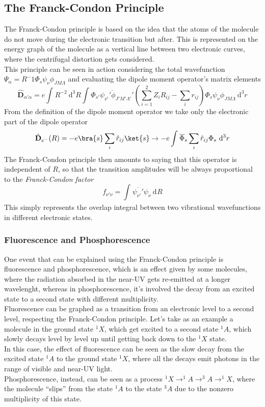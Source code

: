 \documentclass[a4paper, 11pt]{book}
\renewcommand{\vec}[1]{\mathbf{#1}}
\newcommand{\1}{\opr{\mathds{1}}}
\newcommand{\diff}[2][]{\ \mathrm{d}^{#1}#2}
\newcommand{\opr}[1]{\hat{#1}}
\newcommand{\cc}[1]{\overline{#1}}
\newcommand{\vecopr}[1]{\opr{\vec{#1}}}
\theoremstyle{plain}
\begin{document}
	\subsection{The Franck-Condon Principle}
	The Franck-Condon principle is based on the idea that the atoms of the molecule do not move during the electronic transition but after. This is represented on the energy graph of the molecule as a vertical line between two electronic curves, where the centrifugal distortion gets considered.\\
	This principle can be seen in action considering the total wavefunction $\Psi_\alpha=R^-1\Phi_s\psi_\nu\phi_{JM\Lambda}$ and evaluating the dipole moment operator's matrix elements
	\begin{equation}
		\vecopr{D}_{\alpha'\alpha}=e\int_{}^{}R^{-2}\diff[3]{R}\int_{}^{}\cc{\Phi_{s'}\psi_{\nu'}'\phi_{J'M'\Lambda'}'}\left( \sum_{i=1}^2Z_iR_{ij}-\sum_{i}r_{ij} \right)\Phi_s\psi_\nu\phi_{JM\Lambda}\diff[3]{r}
		\label{eq:frankcondon}
	\end{equation}
	From the definition of the dipole moment operator we take only the electronic part of the dipole operator
	\begin{equation*}
		\vecopr{D}_{e^-}(R)=-e\bra{s}\sum_i\opr{r}_{ij}\ket{s}\to-e\int_{}^{}\cc{\Phi}_s\sum_i\opr{r}_{ij}\Phi_s\diff[3]{r}
	\end{equation*}
	The Franck-Condon principle then amounts to saying that this operator is independent of $R$, so that the transition amplitudes will be always proportional to the \textit{Franck-Condon factor}
	\begin{equation}
		f_{\nu'\nu}=\int_{}^{}\cc{\psi_{\nu'}'}\psi_{\nu}\diff{R}
		\label{eq:franckcondonfactor}
	\end{equation}
	This simply represents the overlap integral between two vibrational wavefunctions in different electronic states.
	\subsubsection{Fluorescence and Phosphorescence}
	One event that can be explained using the Franck-Condon principle is fluorescence and phosphorescence, which is an effect given by some molecules, where the radiation absorbed in the near-UV gets re-emitted at a longer wavelenght, whereas in phosphorescence, it's involved the decay from an excited state to a second state with different multiplicity.\\
	Fluorescence can be graphed as a transition from an electronic level to a second level, respecting the Franck-Condon principle. Let's take as an example a molecule in the ground state $^1X$, which get excited to a second state $^1A$, which slowly decays level by level up until getting back down to the $^1X$ state.\\
	In this case, the effect of fluorescence can be seen as the slow decay from the excited state $^1A$ to the ground state $^1X$, where all the decays emit photons in the range of visible and near-UV light.\\
	Phosphorescence, instead, can be seen as a process $^1X\to^1A\to^3A\to^1X$, where the molecule ``slips'' from the state $^1A$ to the state $^3A$ due to the nonzero multiplicity of this state.
\end{document}
